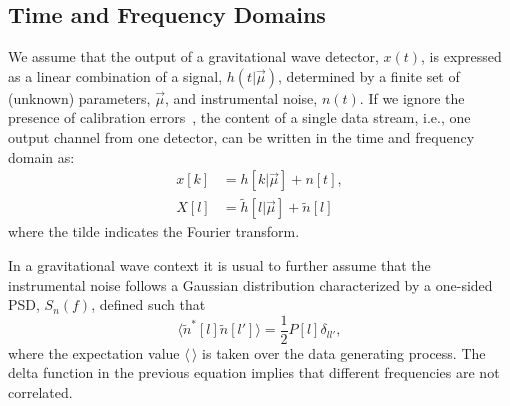 \documentclass[%
 reprint,
superscriptaddress,
nofootinbib,
 amsmath,amssymb,
 aps,
colorlinks = true, 
linkcolor = blue, 
urlcolor = blue, 
citecolor = blue, 
anchorcolor = blue,
]{revtex4-2}
\begin{document}
\subsection{Time and Frequency Domains}


We assume that the output of a gravitational wave detector, $x(t)$, is expressed as a linear combination of a signal, $h(t| \vec{\mu})$, determined by a finite set of (unknown) parameters, $\vec{\mu}$, and instrumental noise, $n(t)$. If we ignore the presence of calibration errors~\cite{Savalle_2022}, the content of a single data stream, i.e., one output channel from one detector, can be written in the time and frequency domain as:
\begin{align}
{x}[k] & = h[k|\vec{\mu}]+ n[t],\\
X[l]& = \tilde{h}[l|\vec{\mu}]+ \tilde{n}[l]
\end{align}
%
where the tilde indicates the Fourier transform. 

In a gravitational wave context it is usual to further assume that the instrumental noise follows a Gaussian distribution characterized by a one-sided PSD, $S_n(f)$, defined such that
\begin{equation}\label{eq:psd_definition}
 \langle \tilde{n}^*[l] \tilde{n}[l'] \rangle = \frac{1}{2} P[l] \delta_{ll'},
\end{equation}
%
where the expectation value $\langle \, \rangle$ is taken over the data generating process. The delta function in the previous equation implies that different frequencies are not correlated.
\end{document}
